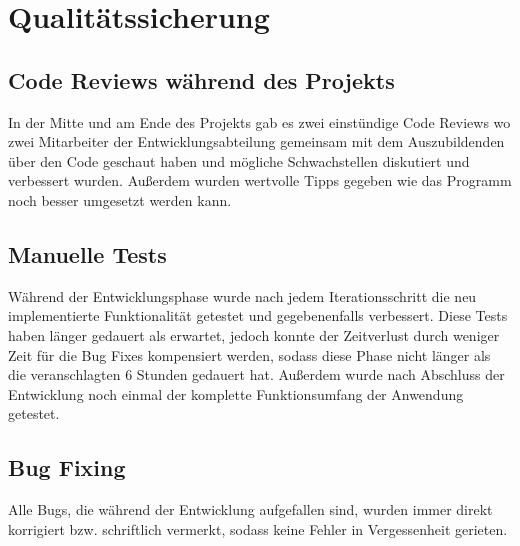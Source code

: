 \section{Qualitätssicherung} 
\label{sec:Qualitätssicherung}

\subsection{Code Reviews während des Projekts}
\label{sec:Code Reviews während des Projekts}
In der Mitte und am Ende des Projekts gab es zwei einstündige Code Reviews wo zwei Mitarbeiter der Entwicklungsabteilung gemeinsam mit dem Auszubildenden über den Code geschaut haben und mögliche Schwachstellen diskutiert und verbessert wurden. Außerdem wurden wertvolle Tipps gegeben wie das Programm noch besser umgesetzt werden kann.    

\subsection{Manuelle Tests}
\label{sec:Manuelle Tests}
Während der Entwicklungsphase wurde nach jedem Iterationsschritt die neu implementierte Funktionalität getestet und gegebenenfalls verbessert. Diese Tests haben länger gedauert als erwartet, jedoch konnte der Zeitverlust durch weniger Zeit für die Bug Fixes kompensiert werden, sodass diese Phase nicht länger als die veranschlagten 6 Stunden gedauert hat. Außerdem wurde nach Abschluss der Entwicklung noch einmal der komplette Funktionsumfang der Anwendung getestet. 

\subsection{Bug Fixing}
\label{sec:Bug Fixing}
Alle Bugs, die während der Entwicklung aufgefallen sind, wurden immer direkt korrigiert bzw. schriftlich vermerkt, sodass keine Fehler in Vergessenheit gerieten.